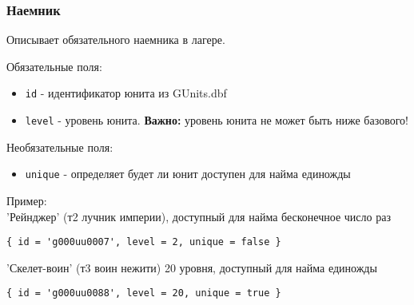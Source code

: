 \subsubsection{Наемник}
\label{mercenaryUnit}
Описывает обязательного наемника в лагере.

Обязательные поля:
\begin{itemize}
\item \texttt{id} - идентификатор юнита из GUnits.dbf
\item \texttt{level} - уровень юнита. \textbf{Важно:} уровень юнита не может быть ниже базового!
\end{itemize}

Необязательные поля:
\begin{itemize}
\item \texttt{unique} - определяет будет ли юнит доступен для найма единожды
\end{itemize}

Пример:\\
'Рейнджер' (т2 лучник империи), доступный для найма бесконечное число раз

\begin{lstlisting}
{ id = 'g000uu0007', level = 2, unique = false }
\end{lstlisting}

'Скелет-воин' (т3 воин нежити) 20 уровня, доступный для найма единожды

\begin{lstlisting}
{ id = 'g000uu0088', level = 20, unique = true }
\end{lstlisting}